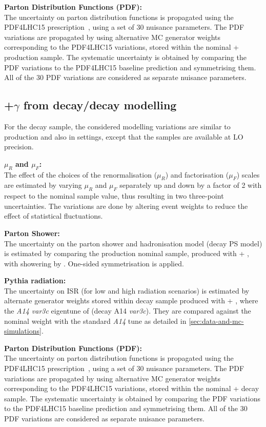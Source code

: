 \textbf{Parton Distribution Functions (PDF):}\\
The uncertainty on parton distribution functions is propagated using the PDF4LHC15 prescription~\cite{Butterworth:2015oua}, using a set of 30 nuisance parameters. The PDF variations are propagated by using alternative MC generator weights corresponding to the PDF4LHC15 variations, stored within the nominal \amcshort + \pythia{} \tty production sample. The systematic uncertainty is obtained by comparing the PDF variations to the PDF4LHC15 baseline prediction and symmetrising them. All of the 30 PDF variations are considered as separate nuisance parameters.


\subsection{\ttbar+$\gamma$ from decay/\tty decay modelling}

For the \tty decay sample, the considered modelling variations are similar to \tty production and also in settings, except that the samples are available at LO precision.

\textbf{$\mu_R$ and $\mu_F$:}\\
The effect of the choices of the renormalisation ($\mu_R$) and factorisation ($\mu_F$) scales are estimated by varying $\mu_R$ and $\mu_F$ separately up and down by a factor of 2 with respect to the nominal sample value, thus resulting in two three-point uncertainties. The variations are done by altering event weights to reduce the effect of statistical fluctuations. 

\textbf{Parton Shower:}\\
The uncertainty on the parton shower and hadronisation model (\tty decay PS model) is estimated by comparing the \tty production nominal sample, produced with \madgraphshort + \pythia{}, with showering by \herwig{}. One-sided symmetrisation is applied.


\textbf{Pythia radiation:}\\
The uncertainty on ISR (for low and high radiation scenarios) is estimated by alternate generator weights stored within \tty decay sample produced with \madgraphshort + \pythia{}, where the \emph{A14 var3c} eigentune of \pythia (\tty decay A14 \emph{var3c}). They are compared against the nominal weight with the standard \emph{A14} tune as detailed in \cref{sec:data-and-mc-simulations}. 

\textbf{Parton Distribution Functions (PDF):}\\
The uncertainty on parton distribution functions is propagated using the PDF4LHC15 prescription~\cite{Butterworth:2015oua}, using a set of 30 nuisance parameters. The PDF variations are propagated by using alternative MC generator weights corresponding to the PDF4LHC15 variations, stored within the nominal \madgraphshort + \pythia{} \tty decay sample. The systematic uncertainty is obtained by comparing the PDF variations to the PDF4LHC15 baseline prediction and symmetrising them. All of the 30 PDF variations are considered as separate nuisance parameters.


